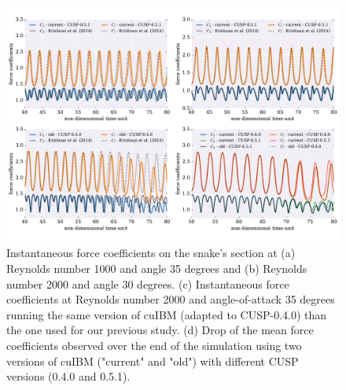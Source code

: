 \documentclass[9pt,twocolumn,twoside]{article}
\begin{document}
\begin{figure}[t]
\centering
\includegraphics[width=1.0\textwidth]{./figures/cuibm_forceCoefficients.pdf}
\caption{
Instantaneous force coefficients on the snake's section at (a) Reynolds number 1000 and angle 35 degrees and (b) Reynolds number 2000 and angle 30 degrees.
(c) Instantaneous force coefficients at Reynolds number 2000 and angle-of-attack 35 degrees running the same version of cuIBM (adapted to CUSP-0.4.0) than the one used for our previous study.
(d) Drop of the mean force coefficients observed over the end of the simulation using two versions of cuIBM ("current" and "old") with different CUSP versions (0.4.0 and 0.5.1).
}
\label{figure11}
\end{figure}
\end{document}
